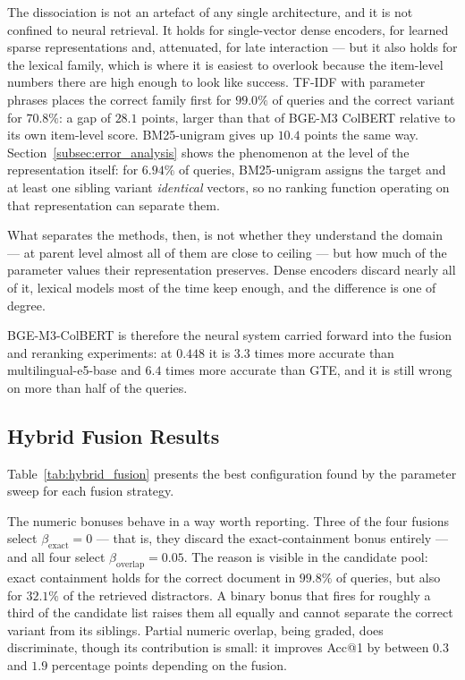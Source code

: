 \documentclass[preprint,12pt]{elsarticle}
\begin{document}
The dissociation is not an artefact of any single architecture, and it is not confined to neural retrieval. It holds for single-vector dense encoders, for learned sparse representations and, attenuated, for late interaction --- but it also holds for the lexical family, which is where it is easiest to overlook because the item-level numbers there are high enough to look like success. TF-IDF with parameter phrases places the correct family first for $99.0\%$ of queries and the correct variant for $70.8\%$: a gap of $28.1$ points, larger than that of BGE-M3 ColBERT relative to its own item-level score. BM25-unigram gives up $10.4$ points the same way. Section~\ref{subsec:error_analysis} shows the phenomenon at the level of the representation itself: for $6.94\%$ of queries, BM25-unigram assigns the target and at least one sibling variant \emph{identical} vectors, so no ranking function operating on that representation can separate them.

What separates the methods, then, is not whether they understand the domain --- at parent level almost all of them are close to ceiling --- but how much of the parameter values their representation preserves. Dense encoders discard nearly all of it, lexical models most of the time keep enough, and the difference is one of degree.

BGE-M3-ColBERT is therefore the neural system carried forward into the fusion and reranking experiments: at $0.448$ it is $3.3$ times more accurate than multilingual-e5-base and $6.4$ times more accurate than GTE, and it is still wrong on more than half of the queries.

\subsection{Hybrid Fusion Results}
\label{subsec:hybrid_results}

Table~\ref{tab:hybrid_fusion} presents the best configuration found by the parameter sweep for each fusion strategy.

The numeric bonuses behave in a way worth reporting. Three of the four fusions select $\beta_{\text{exact}}=0$ --- that is, they discard the exact-containment bonus entirely --- and all four select $\beta_{\text{overlap}}=0.05$. The reason is visible in the candidate pool: exact containment holds for the correct document in $99.8\%$ of queries, but also for $32.1\%$ of the retrieved distractors. A binary bonus that fires for roughly a third of the candidate list raises them all equally and cannot separate the correct variant from its siblings. Partial numeric overlap, being graded, does discriminate, though its contribution is small: it improves Acc@1 by between $0.3$ and $1.9$ percentage points depending on the fusion.
\end{document}
